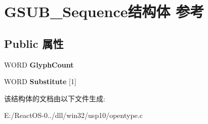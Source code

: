 \hypertarget{struct_g_s_u_b___sequence}{}\section{G\+S\+U\+B\+\_\+\+Sequence结构体 参考}
\label{struct_g_s_u_b___sequence}
\subsection*{Public 属性}
\begin{DoxyCompactItemize}
\item 
\mbox{\label{struct_g_s_u_b___sequence_af72be8966ff7e347aee40da8f08b61be}} 
W\+O\+RD {\bfseries Glyph\+Count}
\item 
\mbox{\label{struct_g_s_u_b___sequence_a6db30bd648ab39e599b08508421c0ea7}} 
W\+O\+RD {\bfseries Substitute} \mbox{[}1\mbox{]}
\end{DoxyCompactItemize}


该结构体的文档由以下文件生成\+:\begin{DoxyCompactItemize}
\item 
E\+:/\+React\+O\+S-\/0../dll/win32/usp10/opentype.\+c\end{DoxyCompactItemize}
